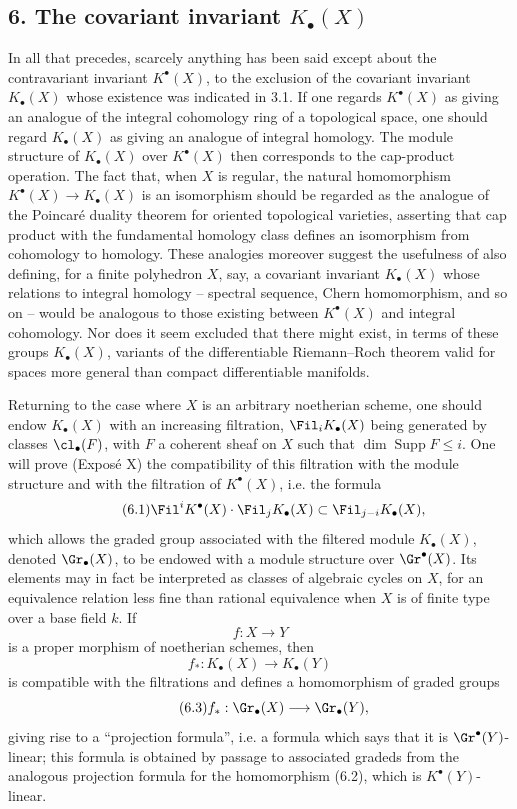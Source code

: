 \subsection*{6. The covariant invariant $K_\bullet(X)$}
In all that precedes, scarcely anything has been said except about the contravariant invariant $K^\bullet(X)$, to the exclusion of the covariant invariant $K_\bullet(X)$ whose existence was indicated in 3.1. If one regards $K^\bullet(X)$ as giving an analogue of the integral cohomology ring of a topological space, one should regard $K_\bullet(X)$ as giving an analogue of integral homology. The module structure of $K_\bullet(X)$ over $K^\bullet(X)$ then corresponds to the cap-product operation. The fact that, when $X$ is regular, the natural homomorphism $K^\bullet(X)\to K_\bullet(X)$ is an isomorphism should be regarded as the analogue of the Poincar\'e duality theorem for oriented topological varieties, asserting that cap product with the fundamental homology class defines an isomorphism from cohomology to homology. These analogies moreover suggest the usefulness of also defining, for a finite polyhedron $X$, say, a covariant invariant $K_\bullet(X)$ whose relations to integral homology -- spectral sequence, Chern homomorphism, and so on -- would be analogous to those existing between $K^\bullet(X)$ and integral cohomology. Nor does it seem excluded that there might exist, in terms of these groups $K_\bullet(X)$, variants of the differentiable Riemann--Roch theorem valid for spaces more general than compact differentiable manifolds.

Returning to the case where $X$ is an arbitrary noetherian scheme, one should endow $K_\bullet(X)$ with an increasing filtration, $\Fil_iK_\bullet(X)$ being generated by classes $\cl_\bullet(F)$, with $F$ a coherent sheaf on $X$ such that $\dim \operatorname{Supp}F\le i$. One will prove (Expos\'e X) the compatibility of this filtration with the module structure and with the filtration of $K^\bullet(X)$, i.e. the formula
\begin{equation}\tag{6.1}
\Fil^iK^\bullet(X)\cdot \Fil_jK_\bullet(X)\subset \Fil_{j-i}K_\bullet(X),
\end{equation}
which allows the graded group associated with the filtered module $K_\bullet(X)$, denoted $\Gr_\bullet(X)$, to be endowed with a module structure over $\Gr^\bullet(X)$. Its elements may in fact be interpreted as classes of algebraic cycles on $X$, for an equivalence relation less fine than rational equivalence when $X$ is of finite type over a base field $k$. If
\[
f:X\longrightarrow Y
\]
is a proper morphism of noetherian schemes, then
\begin{equation}\tag{6.2}
f_*:K_\bullet(X)\longrightarrow K_\bullet(Y)
\end{equation}
is compatible with the filtrations and defines a homomorphism of graded groups
\begin{equation}\tag{6.3}
f_*:\Gr_\bullet(X)\longrightarrow \Gr_\bullet(Y),
\end{equation}
giving rise to a ``projection formula'', i.e. a formula which says that it is $\Gr^\bullet(Y)$-linear; this formula is obtained by passage to associated gradeds from the analogous projection formula for the homomorphism (6.2), which is $K^\bullet(Y)$-linear.

